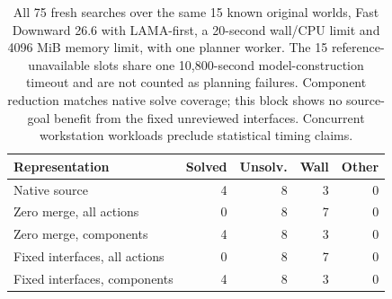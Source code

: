 \begin{table}[t]
\centering
\small
\begin{tabular}{lrrrr}
\toprule
Representation & Solved & Unsolv. & Wall & Other \\
\midrule
Native source & 4 & 8 & 3 & 0 \\
Zero merge, all actions & 0 & 8 & 7 & 0 \\
Zero merge, components & 4 & 8 & 3 & 0 \\
Fixed interfaces, all actions & 0 & 8 & 7 & 0 \\
Fixed interfaces, components & 4 & 8 & 3 & 0 \\
\bottomrule
\end{tabular}
\caption{All 75 fresh searches over the same 15 known original worlds, Fast Downward 26.6 with LAMA-first, a 20-second wall/CPU limit and 4096 MiB memory limit, with one planner worker. The 15 reference-unavailable slots share one 10,800-second model-construction timeout and are not counted as planning failures. Component reduction matches native solve coverage; this block shows no source-goal benefit from the fixed unreviewed interfaces. Concurrent workstation workloads preclude statistical timing claims.}
\label{tab:matched-source-worlds-oct23}
\end{table}
